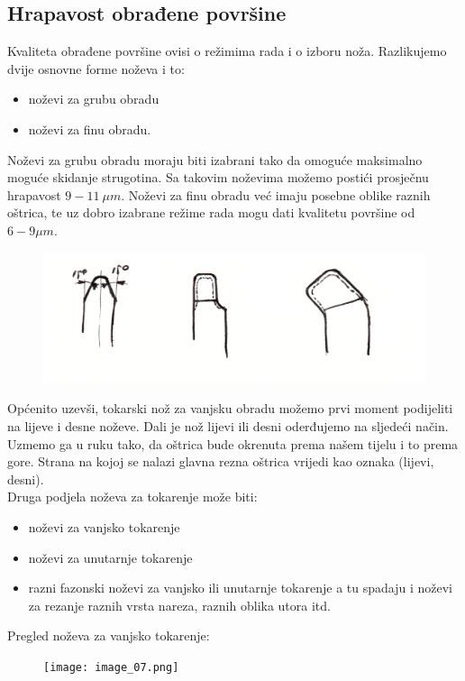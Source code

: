 \documentclass[a4paper,12pt]{article}
\numberwithin{figure}{section}
\begin{document}
\subsection{Hrapavost obrađene površine}
Kvaliteta obrađene površine ovisi o režimima rada i o izboru noža. Razlikujemo dvije osnovne forme noževa i to:
\begin{itemize}
\item noževi za grubu obradu
\item noževi za finu obradu.
\end{itemize}
Noževi za grubu obradu moraju biti izabrani tako da omoguće maksimalno moguće skidanje strugotina. Sa takovim noževima možemo postići prosječnu hrapavost  $9 - 11\:\mu m$. Noževi za finu obradu već imaju posebne oblike raznih oštrica, te uz dobro izabrane režime rada mogu dati kvalitetu površine od $6-9 \mu m$.
\begin{figure}[!h]
\includegraphics[width=\textwidth]{image_06-2.png}
\end{figure}
\FloatBarrier
Općenito uzevši, tokarski nož za vanjsku obradu možemo prvi moment podijeliti na lijeve i desne noževe. Dali je nož lijevi ili desni oderđujemo na sljedeći način. Uzmemo ga u ruku tako, da oštrica bude okrenuta prema našem tijelu i to prema gore. Strana na kojoj se nalazi glavna rezna oštrica vrijedi kao oznaka (lijevi, desni).\\
Druga podjela noževa za tokarenje može biti:
\begin{itemize}
\item noževi za vanjsko tokarenje
\item noževi za unutarnje tokarenje
\item razni fazonski noževi za vanjsko ili unutarnje tokarenje a tu spadaju i noževi za rezanje raznih vrsta nareza, raznih oblika utora itd.
\end{itemize}
Pregled noževa za vanjsko tokarenje:
\begin{figure}[!h]
\texttt{[image: image\_07.png]}
\end{figure}
\FloatBarrier
\end{document}
